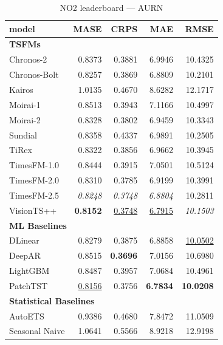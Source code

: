 \begin{table}[H]
\caption{NO2 leaderboard --- AURN}
\centering
\begin{small}
\begin{tabular}{lrrrr}
\toprule
model & MASE & CRPS & MAE & RMSE \\
\midrule
\multicolumn{5}{l}{\textbf{TSFMs}} \\
Chronos-2 & 0.8373 & 0.3881 & 6.9946 & 10.4325 \\
Chronos-Bolt & 0.8257 & 0.3869 & 6.8809 & 10.2101 \\
Kairos & 1.0135 & 0.4670 & 8.6282 & 12.1717 \\
Moirai-1 & 0.8513 & 0.3943 & 7.1166 & 10.4997 \\
Moirai-2 & 0.8328 & 0.3802 & 6.9459 & 10.3343 \\
Sundial & 0.8358 & 0.4337 & 6.9891 & 10.2505 \\
TiRex & 0.8322 & 0.3856 & 6.9662 & 10.3945 \\
TimesFM-1.0 & 0.8444 & 0.3915 & 7.0501 & 10.5124 \\
TimesFM-2.0 & 0.8310 & 0.3785 & 6.9199 & 10.3991 \\
TimesFM-2.5 & \textit{0.8248} & \textit{0.3748} & \textit{6.8804} & 10.2811 \\
VisionTS++ & \textbf{0.8152} & \underline{0.3748} & \underline{6.7915} & \textit{10.1503} \\
\midrule
\multicolumn{5}{l}{\textbf{ML Baselines}} \\
DLinear & 0.8279 & 0.3875 & 6.8858 & \underline{10.0502} \\
DeepAR & 0.8515 & \textbf{0.3696} & 7.0156 & 10.6980 \\
LightGBM & 0.8487 & 0.3957 & 7.0684 & 10.4961 \\
PatchTST & \underline{0.8156} & 0.3756 & \textbf{6.7834} & \textbf{10.0208} \\
\midrule
\multicolumn{5}{l}{\textbf{Statistical Baselines}} \\
AutoETS & 0.9386 & 0.4680 & 7.8472 & 11.0509 \\
Seasonal Naive & 1.0641 & 0.5566 & 8.9218 & 12.9198 \\
\bottomrule
\end{tabular}
\end{small}
\end{table}